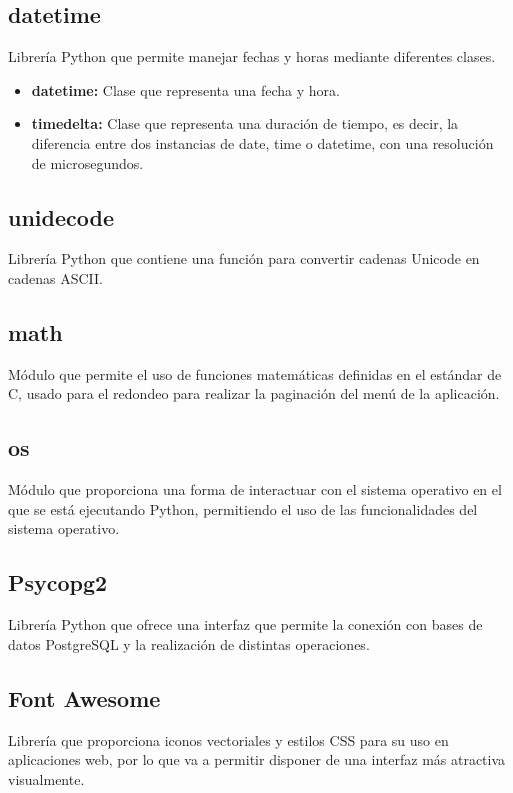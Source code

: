 \subsection{datetime}
\cite{datetime} Librería Python que permite manejar fechas y horas mediante diferentes clases.

\begin{itemize}
    \item \textbf{datetime:} Clase que representa una fecha y hora.
    \item \textbf{timedelta:} Clase que representa una duración de tiempo, es decir, la diferencia entre dos instancias de date, time o datetime, con una resolución de microsegundos.
\end{itemize}

\subsection{unidecode}
\cite{unidecode} Librería Python que contiene una función para convertir cadenas Unicode en cadenas  ASCII.

\subsection{math}
\cite{math} Módulo que permite el uso de funciones matemáticas definidas en el estándar de C, usado para el redondeo para realizar la paginación del menú de la aplicación.

\subsection{os}
\cite{os} Módulo que proporciona una forma de interactuar con el sistema operativo en el que se está ejecutando Python, permitiendo el uso de las funcionalidades del sistema operativo.

\subsection{Psycopg2}
\cite{psycopg2} Librería Python que ofrece una interfaz que permite la conexión con bases de datos PostgreSQL y la realización de distintas operaciones.

\subsection{Font Awesome}
\cite{font} Librería que proporciona iconos vectoriales y estilos CSS para su uso en aplicaciones web, por lo que va a permitir disponer de una interfaz más atractiva visualmente.

